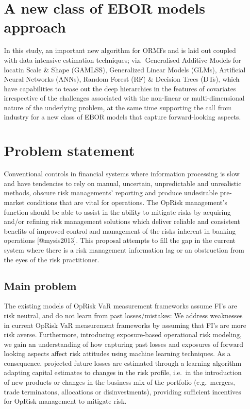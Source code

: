 \documentclass[]{article}
\begin{document}
\section{A new class of EBOR models approach}
\label{sec:A new class of EBOR models approach}

In this study, an important new algorithm for ORMFs and is laid out
coupled with data intensive estimation techniques; viz.~Generalised
Additive Models for locatin Scale \& Shape (GAMLSS), Generalized Linear
Models (GLMs), Artificial Neural Networks (ANNs), Random Forest (RF) \&
Decision Trees (DTs), which have capabilities to tease out the deep
hierarchies in the features of covariates irrespective of the challenges
associated with the non-linear or multi-dimensional nature of the
underlying problem, at the same time supporting the call from industry
for a new class of EBOR models that capture forward-looking aspects.

\section{Problem statement}
\label{sec:Problem statement}

Conventional controls in financial systems where information processing
is slow and have tendencies to rely on manual, uncertain, unpredictable
and unrealistic methods, obscure risk managements' reporting and produce
undesirable pre-market conditions that are vital for operations. The
OpRisk management's function should be able to assist in the ability to
mitigate risks by acquiring and/or refining risk management solutions
which deliver reliable and consistent benefits of improved control and
management of the risks inherent in banking operations {[}@mysis2013{]}.
This proposal attempts to fill the gap in the current system where there
is a risk management information lag or an obstruction from the eyes of
the risk practitioner.

\subsection{Main problem}

The existing models of OpRisk VaR measurement frameworks assume FI's are
risk neutral, and do not learn from past losses/mistakes: We address
weaknesses in current OpRisk VaR measurement frameworks by assuming that
FI's are more risk averse. Furthermore, introducing exposure-based
operational risk modeling, we gain an understanding of how capturing
past losses and exposures of forward looking aspects affect risk
attitudes using machine learning techniques. As a consequence, projected
future losses are estimated through a learning algorithm adapting
capital estimates to changes in the risk profile, i.e.~in the
introduction of new products or changes in the business mix of the
portfolio (e.g.~mergers, trade terminatons, allocations or
disinvestments), providing sufficient incentives for OpRisk management
to mitigate risk.
\end{document}
